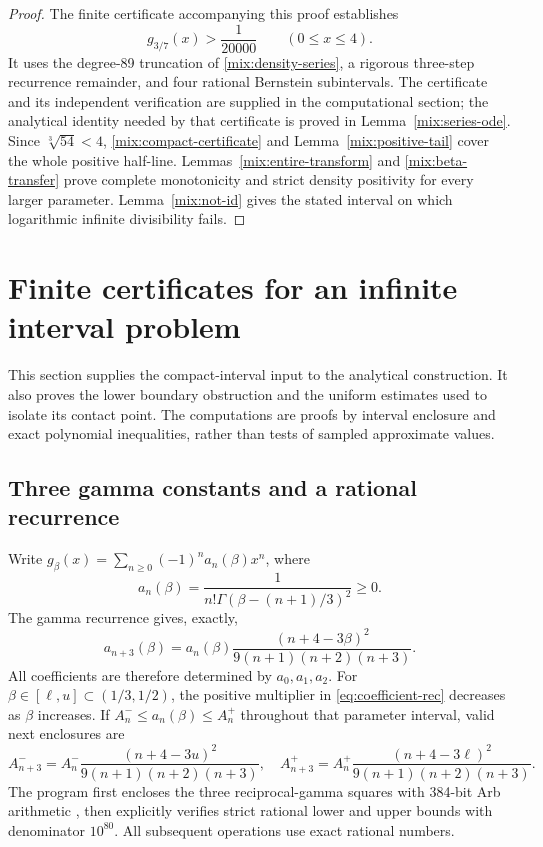 \documentclass[11pt,a4paper]{article}
\numberwithin{equation}{section}
\theoremstyle{definition}\newtheorem{definition}[theorem]{Definition}
\theoremstyle{remark}\newtheorem{remark}[theorem]{Remark}
\begin{document}
\begin{proof}
The finite certificate accompanying this proof establishes
\begin{equation}\label{mix:compact-certificate}
                  g_{3/7}(x)>\frac1{20000}
                           \qquad(0\le x\le4).
\end{equation}
It uses the degree-89 truncation of \eqref{mix:density-series},
a rigorous three-step recurrence remainder, and four rational
Bernstein subintervals.  The certificate and its independent
verification are supplied in the computational section; the
analytical identity needed by that certificate is proved in
Lemma~\ref{mix:series-ode}.
Since \(\sqrt[3]{54}<4\), \eqref{mix:compact-certificate} and
Lemma~\ref{mix:positive-tail} cover the whole positive half-line.
Lemmas~\ref{mix:entire-transform} and \ref{mix:beta-transfer} prove
complete monotonicity and strict density positivity for every larger
parameter.  Lemma~\ref{mix:not-id} gives the stated interval on which
logarithmic infinite divisibility fails.
\end{proof}


\section{Finite certificates for an infinite interval problem}
\label{sec:certificate}

This section supplies the compact-interval input to the analytical
construction. It also proves the lower boundary obstruction and the
uniform estimates used to isolate its contact point. The computations
are proofs by interval enclosure and exact polynomial inequalities,
rather than tests of sampled approximate values.

\subsection{Three gamma constants and a rational recurrence}

Write \(g_\beta(x)=\sum_{n\ge0}(-1)^n a_n(\beta)x^n\), where
\[
 a_n(\beta)=\frac1{n!\Gamma(\beta-(n+1)/3)^2}\ge0.
\]
The gamma recurrence gives, exactly,
\begin{equation}\label{eq:coefficient-rec}
 a_{n+3}(\beta)=a_n(\beta)
 \frac{(n+4-3\beta)^2}{9(n+1)(n+2)(n+3)}.
\end{equation}
All coefficients are therefore determined by \(a_0,a_1,a_2\).
For \(\beta\in[\ell,u]\subset(1/3,1/2)\), the positive multiplier
in \eqref{eq:coefficient-rec} decreases as \(\beta\) increases.
If \(A_n^-\le a_n(\beta)\le A_n^+\) throughout that parameter
interval, valid next enclosures are
\[
 A_{n+3}^-=A_n^-\frac{(n+4-3u)^2}{9(n+1)(n+2)(n+3)},\quad
 A_{n+3}^+=A_n^+\frac{(n+4-3\ell)^2}{9(n+1)(n+2)(n+3)}.
\]
The program first encloses the three reciprocal-gamma squares with
384-bit Arb arithmetic \cite{Johansson}, then explicitly verifies
strict rational lower and upper bounds with denominator \(10^{80}\).
All subsequent operations use exact rational numbers.
\end{document}
